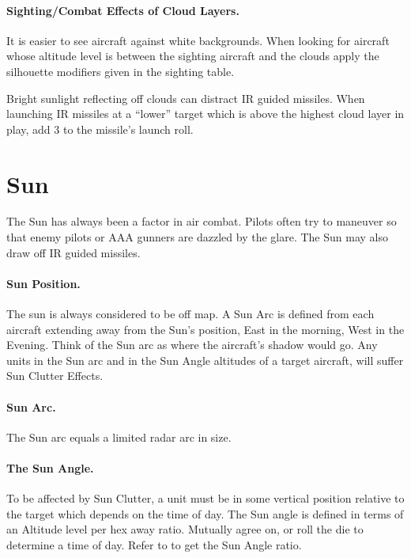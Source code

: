 \begin{advancedrules}
\paragraph{Sighting/Combat Effects of Cloud Layers.} It is easier to see aircraft against white backgrounds. When looking for aircraft whose altitude level is between the sighting aircraft and the clouds apply the silhouette modifiers given in the sighting table.

Bright sunlight reflecting off clouds can distract IR guided missiles. When launching IR missiles at a “lower” target which is above the highest cloud layer in play, add 3 to the missile's launch roll.



\section{Sun}
\label{rule:sun}


The Sun has always been a factor in air combat. Pilots often try to maneuver so that enemy pilots or AAA gunners are dazzled by the glare. The Sun may also draw off IR guided missiles.

\paragraph{Sun Position.} The sun is always considered to be off map. A Sun Arc is defined from each aircraft extending away from the Sun's position, East in the morning, West in the Evening. Think of the Sun arc as where the aircraft's shadow would go. Any units in the Sun arc and in the Sun Angle altitudes of a target aircraft, will suffer Sun Clutter Effects.

\paragraph{Sun Arc.} The Sun arc equals a limited radar arc in size. 


\paragraph{The Sun Angle.} To be affected by Sun Clutter, a unit must be in some vertical position relative to the target which depends on the time of day. The Sun angle is defined in terms of an Altitude level per hex away ratio. Mutually agree on, or roll the die to determine a time of day. Refer to  to get the Sun Angle ratio.


\end{advancedrules}
